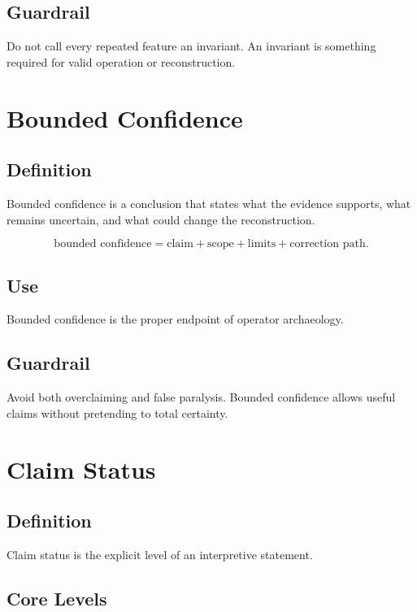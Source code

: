\documentclass[11pt]{book}
\begin{document}
\subsection*{Guardrail}

Do not call every repeated feature an invariant. An invariant is something required for valid operation or reconstruction.

\section{Bounded Confidence}

\subsection*{Definition}

Bounded confidence is a conclusion that states what the evidence supports, what remains uncertain, and what could change the reconstruction.

\[
\text{bounded confidence} =
\text{claim} + \text{scope} + \text{limits} + \text{correction path}.
\]

\subsection*{Use}

Bounded confidence is the proper endpoint of operator archaeology.

\subsection*{Guardrail}

Avoid both overclaiming and false paralysis. Bounded confidence allows useful claims without pretending to total certainty.

\section{Claim Status}

\subsection*{Definition}

Claim status is the explicit level of an interpretive statement.

\subsection*{Core Levels}
\end{document}
